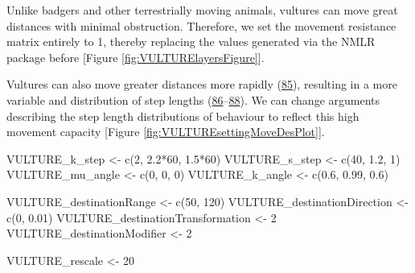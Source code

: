 \documentclass[10pt,a4paper]{article}
\newenvironment{Shaded}{}{}
\newcommand{\DecValTok}[1]{#1}
\newcommand{\FloatTok}[1]{#1}
\newcommand{\FunctionTok}[1]{#1}
\newcommand{\NormalTok}[1]{#1}
\newcommand{\OtherTok}[1]{#1}
\newcommand{\SpecialCharTok}[1]{#1}
\begin{document}
Unlike badgers and other terrestrially moving animals, vultures can move great distances with minimal obstruction.
Therefore, we set the movement resistance matrix entirely to 1, thereby replacing the values generated via the NMLR package before {[}Figure \ref{fig:VULTURElayersFigure}{]}.

\begin{Shaded}
\end{Shaded}

Vultures can also move greater distances more rapidly (\protect\hyperlink{ref-hribsek_first_2021}{85}), resulting in a more variable and distribution of step lengths (\protect\hyperlink{ref-garcia-jimenez_drivers_2018}{86}--\protect\hyperlink{ref-subedi_spatial_2020}{88}).
We can change arguments describing the step length distributions of behaviour to reflect this high movement capacity {[}Figure \ref{fig:VULTUREsettingMoveDesPlot}{]}.

\begin{Shaded}
\begin{Highlighting}[]
\NormalTok{VULTURE\_k\_step }\OtherTok{\textless{}{-}} \FunctionTok{c}\NormalTok{(}\DecValTok{2}\NormalTok{, }\FloatTok{2.2}\SpecialCharTok{*}\DecValTok{60}\NormalTok{, }\FloatTok{1.5}\SpecialCharTok{*}\DecValTok{60}\NormalTok{)}
\NormalTok{VULTURE\_s\_step }\OtherTok{\textless{}{-}} \FunctionTok{c}\NormalTok{(}\DecValTok{40}\NormalTok{, }\FloatTok{1.2}\NormalTok{, }\DecValTok{1}\NormalTok{)}
\NormalTok{VULTURE\_mu\_angle }\OtherTok{\textless{}{-}} \FunctionTok{c}\NormalTok{(}\DecValTok{0}\NormalTok{, }\DecValTok{0}\NormalTok{, }\DecValTok{0}\NormalTok{)}
\NormalTok{VULTURE\_k\_angle }\OtherTok{\textless{}{-}} \FunctionTok{c}\NormalTok{(}\FloatTok{0.6}\NormalTok{, }\FloatTok{0.99}\NormalTok{, }\FloatTok{0.6}\NormalTok{)}

\NormalTok{VULTURE\_destinationRange }\OtherTok{\textless{}{-}} \FunctionTok{c}\NormalTok{(}\DecValTok{50}\NormalTok{, }\DecValTok{120}\NormalTok{)}
\NormalTok{VULTURE\_destinationDirection }\OtherTok{\textless{}{-}} \FunctionTok{c}\NormalTok{(}\DecValTok{0}\NormalTok{, }\FloatTok{0.01}\NormalTok{)}
\NormalTok{VULTURE\_destinationTransformation }\OtherTok{\textless{}{-}} \DecValTok{2}
\NormalTok{VULTURE\_destinationModifier }\OtherTok{\textless{}{-}} \DecValTok{2}

\NormalTok{VULTURE\_rescale }\OtherTok{\textless{}{-}} \DecValTok{20}
\end{Highlighting}
\end{Shaded}
\end{document}
